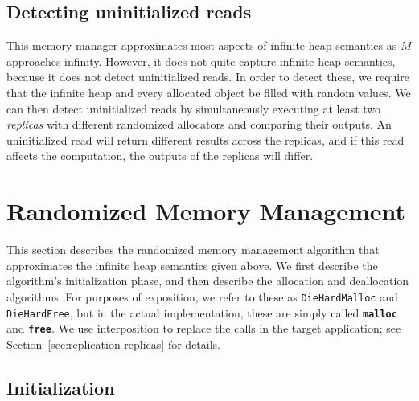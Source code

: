 \documentclass{sig-alternate}
\newcommand{\cfunction}[1]{{\bf \tt #1}}
\newcommand{\malloc}{\cfunction{malloc}}
\newcommand{\free}{\cfunction{free}}
\begin{document}
\subsection{Detecting uninitialized reads}
\noindent
This memory manager approximates most aspects of
infinite-heap semantics as $M$ approaches infinity. However, it does
not quite capture infinite-heap semantics, because it does not detect
uninitialized reads. In order to detect these, we
require that the infinite heap and every allocated object be filled
with random values. We can then detect uninitialized reads by
simultaneously executing at least two \emph{replicas} with different
randomized allocators and comparing their outputs. An uninitialized
read will return different results across the replicas, and if this
read affects the computation, the outputs of the replicas will differ.



\section{Randomized Memory Management}
\label{sec:randomized}

\noindent
This section describes the randomized memory management algorithm that
approximates the infinite heap semantics given above. We first
describe the algorithm's initialization phase, and then describe the
allocation and deallocation algorithms. For purposes of exposition, we
refer to these as \texttt{DieHardMalloc} and \texttt{DieHardFree}, but
in the actual implementation, these are simply called
\malloc{} and \free{}. We use interposition to replace the calls in
the target application; see Section~\ref{sec:replication-replicas} for
details.

\subsection{Initialization}
\label{sec:randomized-initialization}
\end{document}
